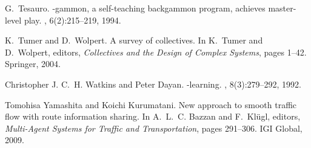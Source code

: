 \documentclass{RITA}
\begin{document}
\begin{thebibliography}{10}
G.~Tesauro.
-gammon, a self-teaching backgammon program, achieves
  master-level play.
, 6(2):215--219, 1994.

K.~Tumer and D.~Wolpert.
\newblock A survey of collectives.
\newblock In K.~Tumer and D.~Wolpert, editors, {\em Collectives and the Design
  of Complex Systems}, pages 1--42. Springer, 2004.

Christopher J. C.~H. Watkins and Peter Dayan.
-learning.
, 8(3):279--292, 1992.

Tomohisa Yamashita and Koichi Kurumatani.
\newblock New approach to smooth traffic flow with route information sharing.
\newblock In A.~L.~C. Bazzan and F.~Kl\"ugl, editors, {\em Multi-Agent Systems
  for Traffic and Transportation}, pages 291--306. IGI Global, 2009.

\end{thebibliography}
\end{document}
